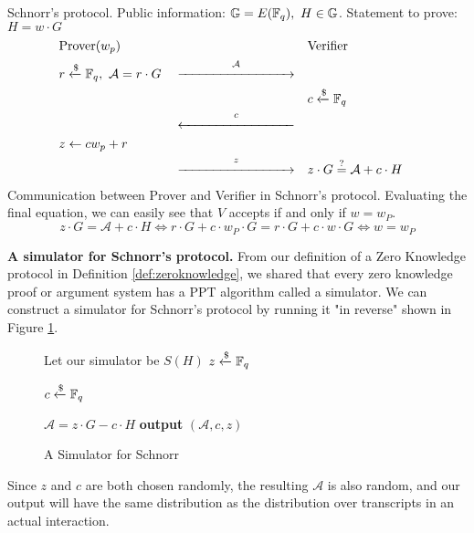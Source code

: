 \begin{protocol}[label={prot:schnorr}]{Schnorr's protocol. Public information: $\mathbb{G} = E(\mathbb{F}_q),\ H \in \mathbb{G}$. Statement to prove: $H = w \cdot G$} 
    \vspace{-0.5cm}
    \begin{align*}
        &\text{Prover}(w_p)& 
        &&
        &\text{Verifier}& 
        \\
        &r \samplefrom \F_q,\ \mathcal A = r \cdot G&
        &\overset  {\mathcal A} {\xrightarrow{\hspace{3cm}}}&
        && 
        \\
        &&
        &&
        &c \samplefrom \F_q&
        \\
        &&
        &\overset c {\xleftarrow{\hspace{3cm}}}&
        &&
        \\
        &z \leftarrow cw_p + r&
        &&
        && 
        \\
        &&
        &\overset {z} {\xrightarrow{\hspace{3cm}}}&
        &z \cdot G \verify \mathcal A + c \cdot H&
    \end{align*}
    \tcblower
    Communication between Prover and Verifier in Schnorr's protocol. Evaluating the final equation, we can easily see that $V$ accepts if and only if $w = w_P$.
    \[
    z \cdot G = \mathcal A + c \cdot H \iff
    r \cdot G + c \cdot w_P \cdot G  = r \cdot G + c \cdot w \cdot G \iff
    w  =  w_P
    \]
\end{protocol}



\textbf{A simulator for Schnorr's protocol.} From our definition of a Zero Knowledge protocol in Definition 
\ref{def:zeroknowledge}, we shared that every zero knowledge proof or argument system has a PPT algorithm called a simulator. 
We can construct a simulator for Schnorr's protocol by running it "in reverse" shown in Figure \ref{fig:schnorr-sim}.

\begin{figure}[h]
    \centering
    \begin{problem}[width=\linewidth/2]{Let our simulator be $S(H)$}
        $z \xleftarrow{\$} \mathbb{F}_q$ 
        
        $c \xleftarrow{\$} \mathbb{F}_q$
        
        $\mathcal A = z \cdot G - c \cdot H$
        \tcblower
        \textbf{output} $(\mathcal A,c,z)$
    \end{problem}
    \caption{A Simulator for Schnorr}
    \label{fig:schnorr-sim}
\end{figure}

Since $z$ and $c$ are both chosen randomly, the resulting $\mathcal A$ is also random, and our output will have the same distribution as the distribution over transcripts in an actual interaction.

